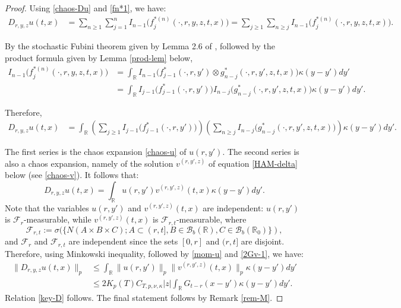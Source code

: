 \documentclass[12pt]{article}
\def\cB{\mathcal{B}}
\def\cF{\mathcal{F}}
\def\bR{\mathbb{R}}
\def\k{\kappa}
\begin{document}
\begin{proof} Using \eqref{chaos-Du} and \eqref{fn*1}, we have:
\begin{align*}
D_{r,y,z}u(t,x)&=\sum_{n\geq 1} \sum_{j=1}^{n}I_{n-1}\big(f_j^{*(n)}(\cdot,r,y,z,t,x)\big)=
\sum_{j\geq 1} \sum_{n\geq j}I_{n-1}\big(f_j^{*(n)}(\cdot,r,y,z,t,x)\big).
\end{align*}

By the stochastic Fubini theorem given by Lemma 2.6 of \cite{BZ24}, followed by the product formula given by Lemma \ref{prod-lem} below, 
\begin{align*}
I_{n-1}\big(f_j^{*(n)}(\cdot,r,y,z,t,x)\big) &=
\int_{\bR}I_{n-1}\big(f_{j-1}^*(\cdot,r,y')\otimes g_{n-j}^*(\cdot,r,y',z,t,x)\big)\k(y-y')dy'\\
&=\int_{\bR}I_{j-1}\big(f_{j-1}^*(\cdot,r,y')\big) I_{n-j}\big( g_{n-j}^*(\cdot,r,y',z,t,x)\big)\k(y-y')dy'.
\end{align*}

Therefore,
\begin{align*}
D_{r,y,z} u(t,x) &= \int_{\bR} \left(\sum_{j\geq 1} I_{j-1}\big(f_{j-1}^*(\cdot,r,y') \big) \right) \left(\sum_{n\geq j} I_{n-j}\big( g_{n-j}^*(\cdot,r,y',z,t,x)\big) \right) \k(y-y')dy'.
\end{align*}

The first series is the chaos expansion \eqref{chaos-u} of $u(r,y')$. The second series is also a chaos expansion, namely of the solution $v^{(r,y',z)}$ of equation \eqref{HAM-delta} below (see \eqref{chaos-v}). It follows that:
\[
D_{r,y,z} u(t,x)=\int_{\bR} u(r,y')v^{(r,y',z)}(t,x)\k(y-y')dy'.
\]
Note that the variables $u(r,y')$ and $v^{(r,y',z)}(t,x)$ are independent: $u(r,y')$ is $\cF_r$-measurable, while $v^{(r,y',z)}(t,x)$ is $\cF_{r,t}$-measurable, where
\begin{equation}
\label{def-Frt}
\cF_{r,t}:=\sigma(\{N(A \times B \times C); A \subset (r,t], B \in \cB_b(\bR),C \in \cB_b(\bR_0)\}),
\end{equation}
and $\cF_r$ and $\cF_{r,t}$ are independent since the sets $[0,r]$ and $(r,t]$ are disjoint. Therefore, using Minkowski inequality, followed by \eqref{mom-u} and \eqref{2Gv-1}, we have:
\begin{align*}
\|D_{r,y,z} u(t,x)\|_p & \leq \int_{\bR} \|u(r,y')\|_p\|v^{(r,y',z)}(t,x)\|_p\k(y-y')dy'\\
& \leq 2 K_p(T) C_{T,p,\nu,\k}|z|\int_{\bR}G_{t-r}(x-y')\k(y-y')dy'.
\end{align*}
Relation \eqref{key-D} follows. The final statement follows by Remark \ref{rem-M}.
\end{proof}
\end{document}
